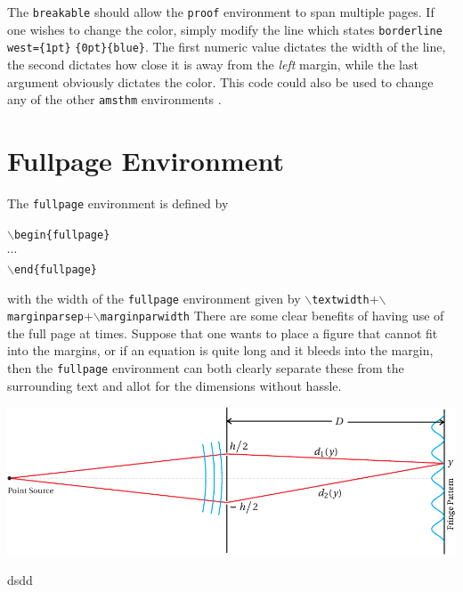 The \texttt{breakable} should allow the \texttt{proof} environment to span multiple pages. If one wishes to change the color, simply modify the line which states \texttt{borderline west=\{1pt\}} \texttt{\{0pt\}\{blue\}}. The first numeric value dictates the width of the line, the second dictates how close it is away from the \textit{left} margin, while the last argument obviously dictates the color. This code could also be used to change any of the other \texttt{amsthm} environments
.


\section{Fullpage Environment}\label{Sec: Fullpage}

\begin{fullpage}
    The \texttt{fullpage} environment is defined by
    \begin{center}
        \texttt{$\backslash$begin\{fullpage\}}\\
        $\cdots$\\
        \texttt{$\backslash$end\{fullpage\}}
    \end{center}
    with the width of the \texttt{fullpage} environment given by \texttt{$\backslash$textwidth}+\texttt{$\backslash$marginparsep}+\texttt{$\backslash$marginparwidth}
    There are some clear benefits of having use of the full page at times. Suppose that one wants to place a figure that cannot fit into the margins, or if an equation is quite long and it bleeds into
     the margin, 
    then the \texttt{fullpage} environment can both clearly separate these from the surrounding text and allot for the dimensions without hassle. 

    \centering
        \includegraphics{img/f08Young.pdf}
        \label{fig:example} %
    \begin{definition}
        dsdd
    \end{definition}
\end{fullpage}

